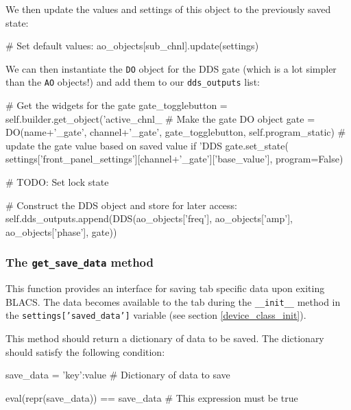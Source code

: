 \documentclass[12pt]{article}
\begin{document}
We then update the values and settings of this object to the previously saved state:
\begin{python}
                # Set default values:
                ao_objects[sub_chnl].update(settings)
\end{python}

We can then instantiate the \texttt{DO} object for the DDS gate (which is a lot simpler than the \texttt{AO} objects!) and add them to our \texttt{dds\_outputs} list:
\begin{python}
            # Get the widgets for the gate
            gate_togglebutton = self.builder.get_object('active_chnl_%
            # Make the gate DO object            
            gate = DO(name+'_gate', 
                      channel+'_gate', 
                      gate_togglebutton, 
                      self.program_static)
            # update the gate value based on saved value
            if 'DDS %
                gate.set_state(
                   settings['front_panel_settings'][channel+'_gate']['base_value'],
                   program=False)
                    
                # TODO: Set lock state
                    
            # Construct the DDS object and store for later access:
            self.dds_outputs.append(DDS(ao_objects['freq'],
                                        ao_objects['amp'],
                                        ao_objects['phase'],
                                        gate))
\end{python}




\subsubsection{The \texttt{get\_save\_data} method} \label{device_class_get_save_data}
This function provides an interface for saving tab specific data upon exiting BLACS. The data becomes available to the tab during the \texttt{\_\_init\_\_} method in the \texttt{settings['saved\_data']} variable (see section \ref{device_class_init}).

This method should return a dictionary of data to be saved. The dictionary should satisfy the following condition:
\begin{python}
save_data = {'key':value} # Dictionary of data to save

eval(repr(save_data)) == save_data # This expression must be true
\end{python}
\end{document}
